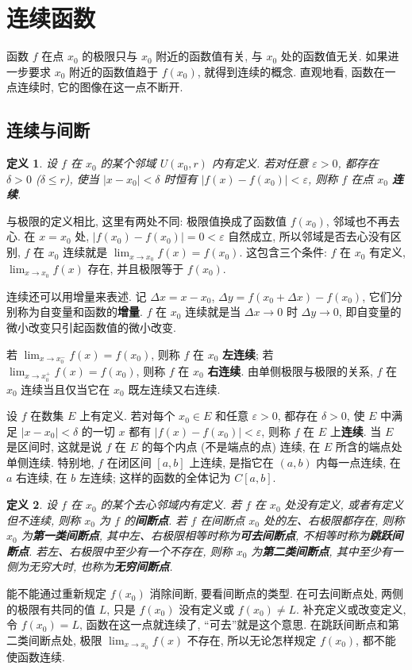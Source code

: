 \documentclass[UTF8,openany]{ctexbook}
\theoremstyle{chinesetextbook}
\newtheorem{definition}{定义}[section]
\begin{document}
\section{连续函数}
函数 $f$ 在点 $x_0$ 的极限只与 $x_0$ 附近的函数值有关, 与 $x_0$ 处的函数值无关. 如果进一步要求 $x_0$ 附近的函数值趋于 $f(x_0)$, 就得到连续的概念. 直观地看, 函数在一点连续时, 它的图像在这一点不断开.
\subsection{连续与间断}
\begin{definition}
设 $f$ 在 $x_0$ 的某个邻域 $U(x_0,r)$ 内有定义. 若对任意 $\varepsilon>0$, 都存在 $\delta>0$ ($\delta\le r$), 使当 $|x-x_0|<\delta$ 时恒有 $|f(x)-f(x_0)|<\varepsilon$, 则称 $f$ 在点 $x_0$ \textbf{连续}.
\end{definition}
与极限的定义相比, 这里有两处不同: 极限值换成了函数值 $f(x_0)$, 邻域也不再去心. 在 $x=x_0$ 处, $|f(x_0)-f(x_0)|=0<\varepsilon$ 自然成立, 所以邻域是否去心没有区别, $f$ 在 $x_0$ 连续就是 $\displaystyle\lim_{x\to x_0}f(x)=f(x_0)$. 这包含三个条件: $f$ 在 $x_0$ 有定义, $\displaystyle\lim_{x\to x_0}f(x)$ 存在, 并且极限等于 $f(x_0)$.

连续还可以用增量来表述. 记 $\Delta x=x-x_0$, $\Delta y=f(x_0+\Delta x)-f(x_0)$, 它们分别称为自变量和函数的\textbf{增量}. $f$ 在 $x_0$ 连续就是当 $\Delta x\to0$ 时 $\Delta y\to0$, 即自变量的微小改变只引起函数值的微小改变.

若 $\displaystyle\lim_{x\to x_0^-}f(x)=f(x_0)$, 则称 $f$ 在 $x_0$ \textbf{左连续}; 若 $\displaystyle\lim_{x\to x_0^+}f(x)=f(x_0)$, 则称 $f$ 在 $x_0$ \textbf{右连续}. 由单侧极限与极限的关系, $f$ 在 $x_0$ 连续当且仅当它在 $x_0$ 既左连续又右连续.

设 $f$ 在数集 $E$ 上有定义. 若对每个 $x_0\in E$ 和任意 $\varepsilon>0$, 都存在 $\delta>0$, 使 $E$ 中满足 $|x-x_0|<\delta$ 的一切 $x$ 都有 $|f(x)-f(x_0)|<\varepsilon$, 则称 $f$ 在 $E$ 上\textbf{连续}. 当 $E$ 是区间时, 这就是说 $f$ 在 $E$ 的每个内点 (不是端点的点) 连续, 在 $E$ 所含的端点处单侧连续. 特别地, $f$ 在闭区间 $[a,b]$ 上连续, 是指它在 $(a,b)$ 内每一点连续, 在 $a$ 右连续, 在 $b$ 左连续; 这样的函数的全体记为 $C[a,b]$.
\begin{definition}
设 $f$ 在 $x_0$ 的某个去心邻域内有定义. 若 $f$ 在 $x_0$ 处没有定义, 或者有定义但不连续, 则称 $x_0$ 为 $f$ 的\textbf{间断点}. 若 $f$ 在间断点 $x_0$ 处的左、右极限都存在, 则称 $x_0$ 为\textbf{第一类间断点}, 其中左、右极限相等时称为\textbf{可去间断点}, 不相等时称为\textbf{跳跃间断点}. 若左、右极限中至少有一个不存在, 则称 $x_0$ 为\textbf{第二类间断点}, 其中至少有一侧为无穷大时, 也称为\textbf{无穷间断点}.
\end{definition}
能不能通过重新规定 $f(x_0)$ 消除间断, 要看间断点的类型. 在可去间断点处, 两侧的极限有共同的值 $L$, 只是 $f(x_0)$ 没有定义或 $f(x_0)\ne L$. 补充定义或改变定义, 令 $f(x_0)=L$, 函数在这一点就连续了, “可去”就是这个意思. 在跳跃间断点和第二类间断点处, 极限 $\displaystyle\lim_{x\to x_0}f(x)$ 不存在, 所以无论怎样规定 $f(x_0)$, 都不能使函数连续.
\end{document}
